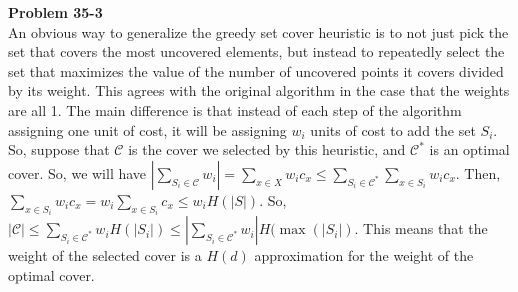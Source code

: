 \documentclass{article}
\begin{document}
\noindent\textbf{Problem 35-3}\\

An obvious way to generalize the greedy set cover heuristic is to not just pick the set that covers the most uncovered elements, but instead to repeatedly select the set that maximizes the value of the number of uncovered points it covers divided by its weight. This agrees with the original algorithm in the case that the weights are all 1. The main difference is that instead of each step of the algorithm assigning one unit of cost, it will be assigning $w_i$ units of cost to add the set $S_i$. So, suppose that $\mathcal{C}$ is the cover we selected by this heuristic, and $\mathcal{C}^*$ is an optimal cover. So, we will have $|\sum_{S_i\in \mathcal{C}} w_i| = \sum_{x\in X} w_ic_x \le \sum_{S_i \in \mathcal{C}^*} \sum_{x\in S_i} w_i c_x$. Then, $\sum_{x\in S_i} w_ic_x = w_i \sum_{x\in S_i} c_x \le w_i H(|S|) $. So, $|\mathcal{C}| \le \sum_{S_i\in \mathcal{C}^*}  w_i H(|S_i|) \le |\sum_{S_i\in \mathcal{C}^*} w_i| H(\max(|S_i|) $. This means that the weight of the selected cover is a $H(d)$ approximation for the weight of the optimal cover.\\
\end{document}
